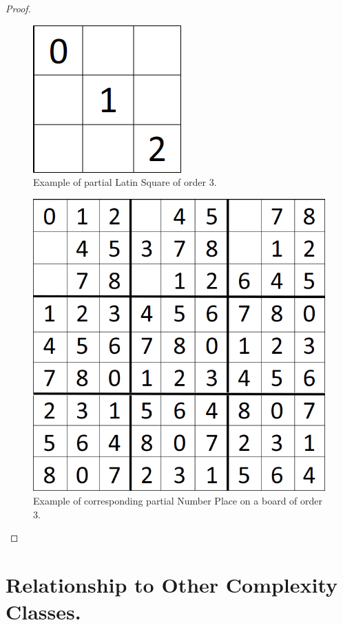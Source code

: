 \documentclass[runningheads,a4paper]{llncs}
\begin{document}
\begin{definition}
\begin{proof}
\begin{figure}[H]
\label{fig:partialLS}
\centering
\includegraphics[scale=0.25]{sudoku-3.png}
\caption{Example of partial Latin Square of order 3.}
\end{figure}

\begin{figure}[H]
\label{fig:partialNP}
\centering
\includegraphics[scale=0.25]{sudoku-1.png}
\caption{Example of corresponding partial Number Place on a board of order 3.}
\end{figure}

\end{proof}

\section{Relationship to Other Complexity Classes.}
\label{sec:relationship}


\end{definition}
\end{document}

